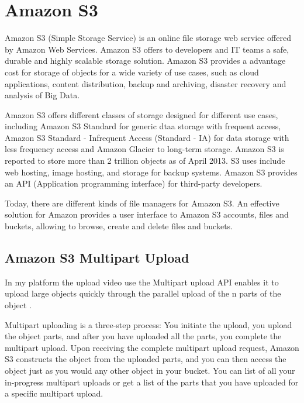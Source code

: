 \section{Amazon S3}
\label{sec:Amazon S3}

Amazon S3 (Simple Storage Service) is an online file storage web service offered by Amazon Web Services. Amazon S3 offers to developers and IT teams a safe, durable and highly scalable storage solution.
Amazon S3 provides a advantage cost for storage of objects for a wide variety of use cases, such as cloud applications, content distribution, backup and archiving, disaster recovery and analysis of Big Data.

Amazon S3 offers different classes of storage designed for different use cases, including Amazon S3 Standard for generic dtaa storage with frequent access, Amazon S3 Standard - Infrequent Access (Standard - IA) for data storage with less frequency access and Amazon Glacier to long-term storage.
Amazon S3 is reported to store more than 2 trillion objects as of April 2013.\cite{s3_stats} S3 uses include web hosting, image hosting, and storage for backup systems. 
Amazon S3 provides an API (Application programming interface) for third-party developers.

Today, there are different kinds of file managers for Amazon S3. An effective solution for Amazon provides a user interface to Amazon S3 accounts, files and buckets, allowing to browse, create and delete files and buckets.

\subsection{Amazon S3 Multipart Upload}
\label{subsec:amazon_S3_multipart_upload_initiation}


In my platform the upload video use the Multipart upload API enables it to upload large objects quickly through the parallel upload of the n parts of the object .

Multipart uploading is a three-step process: You initiate the upload, you upload the object parts, and after you have uploaded all the parts, you complete the multipart upload. Upon receiving the complete multipart upload request, Amazon S3 constructs the object from the uploaded parts, and you can then access the object just as you would any other object in your bucket.
You can list of all your in-progress multipart uploads or get a list of the parts that you have uploaded for a specific multipart upload.\cite{s3_multipart}



